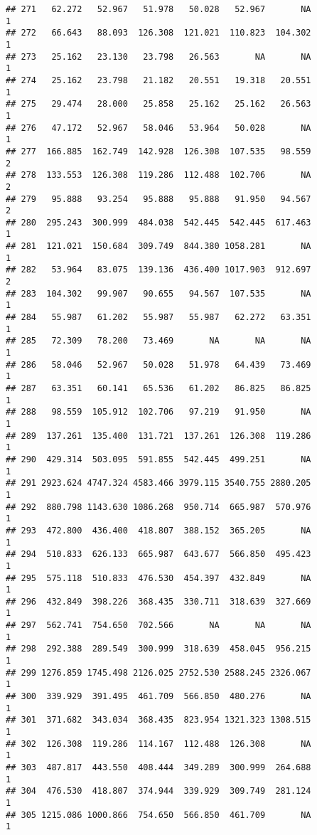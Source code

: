 \documentclass[
]{article}
\begin{document}
\begin{verbatim}
## 271   62.272   52.967   51.978   50.028   52.967       NA             1
## 272   66.643   88.093  126.308  121.021  110.823  104.302             1
## 273   25.162   23.130   23.798   26.563       NA       NA             1
## 274   25.162   23.798   21.182   20.551   19.318   20.551             1
## 275   29.474   28.000   25.858   25.162   25.162   26.563             1
## 276   47.172   52.967   58.046   53.964   50.028       NA             1
## 277  166.885  162.749  142.928  126.308  107.535   98.559             2
## 278  133.553  126.308  119.286  112.488  102.706       NA             2
## 279   95.888   93.254   95.888   95.888   91.950   94.567             2
## 280  295.243  300.999  484.038  542.445  542.445  617.463             1
## 281  121.021  150.684  309.749  844.380 1058.281       NA             1
## 282   53.964   83.075  139.136  436.400 1017.903  912.697             2
## 283  104.302   99.907   90.655   94.567  107.535       NA             1
## 284   55.987   61.202   55.987   55.987   62.272   63.351             1
## 285   72.309   78.200   73.469       NA       NA       NA             1
## 286   58.046   52.967   50.028   51.978   64.439   73.469             1
## 287   63.351   60.141   65.536   61.202   86.825   86.825             1
## 288   98.559  105.912  102.706   97.219   91.950       NA             1
## 289  137.261  135.400  131.721  137.261  126.308  119.286             1
## 290  429.314  503.095  591.855  542.445  499.251       NA             1
## 291 2923.624 4747.324 4583.466 3979.115 3540.755 2880.205             1
## 292  880.798 1143.630 1086.268  950.714  665.987  570.976             1
## 293  472.800  436.400  418.807  388.152  365.205       NA             1
## 294  510.833  626.133  665.987  643.677  566.850  495.423             1
## 295  575.118  510.833  476.530  454.397  432.849       NA             1
## 296  432.849  398.226  368.435  330.711  318.639  327.669             1
## 297  562.741  754.650  702.566       NA       NA       NA             1
## 298  292.388  289.549  300.999  318.639  458.045  956.215             1
## 299 1276.859 1745.498 2126.025 2752.530 2588.245 2326.067             1
## 300  339.929  391.495  461.709  566.850  480.276       NA             1
## 301  371.682  343.034  368.435  823.954 1321.323 1308.515             1
## 302  126.308  119.286  114.167  112.488  126.308       NA             1
## 303  487.817  443.550  408.444  349.289  300.999  264.688             1
## 304  476.530  418.807  374.944  339.929  309.749  281.124             1
## 305 1215.086 1000.866  754.650  566.850  461.709       NA             1

\end{verbatim}
\end{document}
